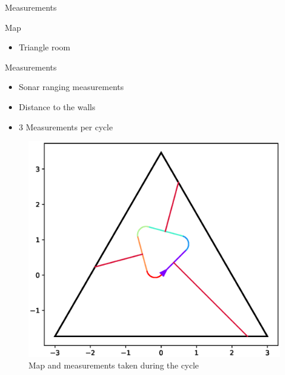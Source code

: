 \documentclass[10pt, xcolor={usenames, dvipsnames}]{beamer}
\begin{document}
        \begin{frame}{Measurements}
            \begin{minipage}{.48\textwidth}
                \begin{block}{Map}
                    \vspace{2.5mm}
                    \begin{itemize}
                        \item Triangle room
                    \end{itemize}
                \end{block}
                \begin{block}{Measurements}
                    \begin{itemize}
                        \item Sonar ranging measurements
                        \item Distance to the walls
                        \item 3 Measurements per cycle
                    \end{itemize}
                \end{block}
            \end{minipage}
            \hfill
            \begin{minipage}{.48\textwidth}
                \begin{figure}
                    \includegraphics[width=\textwidth]{imgs/cycle_measurements}
                    \caption{Map and measurements taken during the cycle}
                \end{figure}
            \end{minipage}
        \end{frame}
\end{document}
